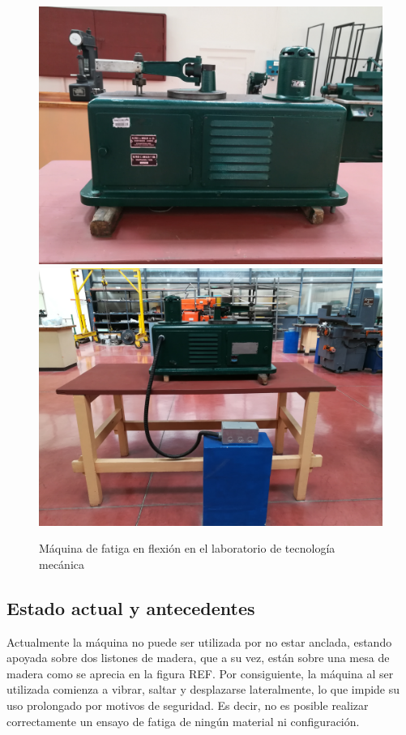 \begin{figure}[h]
\centering
\includegraphics[scale=0.05]{Imagenes/maq_del.jpg}
\label{fig:maq_del}
\includegraphics[scale=0.05]{Imagenes/maqfull_post.jpg}
\label{fig:maqfull_post}
\caption{Máquina de fatiga en flexión en el laboratorio de tecnología mecánica}
\label{fig:maq_fat}
\end{figure}



\subsection{Estado actual y antecedentes}
Actualmente la máquina no puede ser utilizada por no estar anclada, estando apoyada sobre dos listones de madera, que a su vez, están sobre una mesa de madera como se aprecia en la figura REF. Por consiguiente, la máquina al ser utilizada comienza a vibrar, saltar y desplazarse lateralmente, lo que impide su uso prolongado por motivos de seguridad. Es decir, no es posible realizar correctamente un ensayo de fatiga de ningún material ni configuración.

